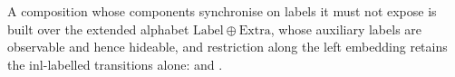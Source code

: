 \begin{definition}
  \label{def:relabel}
  \leanok
  A composition whose components synchronise on labels it must not expose is built over the extended alphabet $\mathrm{Label} \oplus \mathrm{Extra}$, whose auxiliary labels are observable and hence hideable, and restriction along the left embedding retains the $\mathrm{inl}$-labelled transitions alone:  and .
\end{definition}
